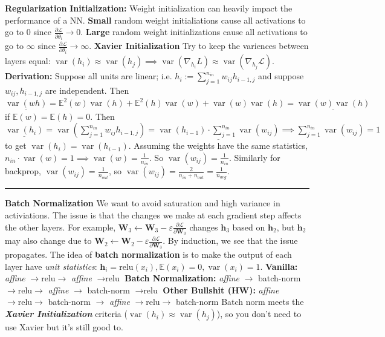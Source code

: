 \documentclass{article}
\newcommand{\E}{\mathbb{E}}
\newcommand{\h}{\bf{h}}
\newcommand{\W}{\bf{W}}
\newcommand{\ot}{\leftarrow}
\renewcommand{\bf}[1]{\textbf{{#1}}}
\renewcommand{\it}[1]{\textit{{#1}}}
\newcommand{\ib}[1]{\textit{\textbf{{#1}}}}
\newcommand{\pd}[2]{\frac{\partial{#1}}{\partial{#2}}}
\newcommand{\grad}[2]{\nabla_{#1}{#2}}
\newcommand{\ul}[1]{\underline{{#1}}}
\newcommand{\relu}{\text{relu}}
\newcommand{\eps}{\varepsilon}
\renewcommand{\L}{\mathcal{L}}
\DeclareMathOperator*{\var}{var}
\begin{document}
\begin{small}
\newpage
\bf{Regularization}
\newline
\bf{Initialization:} Weight initialization can heavily impact the performance of a NN. \bf{Small} 
random weight initialiations cause all activations to go to 0 since $\pd{\L}{\theta_i} \to 0$.
\bf{Large} random weight initializations cause all activations to go to $\infty$ since
$\pd{\L}{\theta_i} \to \infty$.
\newline
\bf{Xavier Initialization}
\newline
Try to keep the variences between layers equal: 
$\var(h_i) \approx \var(h_j) \implies \var(\grad{h_i}{L}) \approx \var(\grad{h_j}{\L})$.
\newline
\bf{Derivation:} Suppose all units are linear; i.e. 
$h_i := \sum_{j = 1}^{n_{\it{in}}} w_{ij} h_{i - 1, j}$ and suppose $w_{ij}, h_{i - 1, j}$ are
independent. Then
$\ul{\var(wh)} = \E^2(w) \var(h) + \E^2(h) \var(w) + \var(w) \var(h) = \ul{\var(w) \var(h)}$ if 
$\E(w) = \E(h) = 0$. Then 
$\ul{\var(h_i)} = \var\left( \sum_{j = 1}^{n_{\it{in}}} w_{ij} h_{i - 1, j} \right)
= \ul{\var(h_{i - 1}) \cdot \sum_{j = 1}^{n_{\it{in}}} \var(w_{ij})}
\implies 
\sum_{j = 1}^{n_{\it{in}}} \var(w_{ij}) = 1$ to get $\var(h_i) = \var(h_{i - 1})$.
Assuming the weights have the same statistics, 
$n_{\it{in}} \cdot \var(w) = 1 \implies \var(w) = \frac{1}{n_{\it{in}}}$. So 
$\var(w_{ij}) = \frac{1}{n_{\it{in}}}$.
Similarly for backprop, 
$\var(w_{ij}) = \frac{1}{n_{\it{out}}}$, so 
$\var(w_{ij}) = \frac{2}{n_{\it{in}} + n_{\it{out}}} = \frac{1}{n_{\it{avg}}}$.
\vspace{0.1em}

\hrule
\vspace{0.1em}

\bf{Batch Normalization}
\newline
We want to avoid saturation and high variance in activiations. The issue is that the changes we make
at each gradient step affects the other layers. For example, $\W_3 \ot \W_3 - \eps
\frac{\partial \L}{\partial \W_3}$ changes $\h_3$ based on $\h_2$, but $\h_2$ may also change
due to $\W_2 \ot \W_2 - \eps \frac{\partial \L}{\partial \W_3}$. By induction, we see that the issue 
propagates. The idea of \bf{batch normalization} is to make the output of each layer have \it{unit
statistics}: $\h_i = \relu(x_i), \E(x_i) = 0, \var(x_i) = 1$.
\newline
\bf{Vanilla:}
\it{affine} $\to \relu \to$ \it{affine} $\to \relu$
\newline
\bf{Batch Normalization:}
\it{affine} $\to$ batch-norm $\to \relu \to$ \it{affine} $\to$ batch-norm $\to \relu$
\newline
\bf{Other Bullshit (HW):}
\it{affine} $\to \relu \to$ batch-norm $\to$ \it{affine} $\to \relu \to$ batch-norm
\newline
Batch norm meets the \ib{Xavier Initialization} criteria ($\var(h_i) \approx \var(h_j)$), so you
don't need to use Xavier but it's still good to.
\vspace{0.1em}


\end{small}
\end{document}
